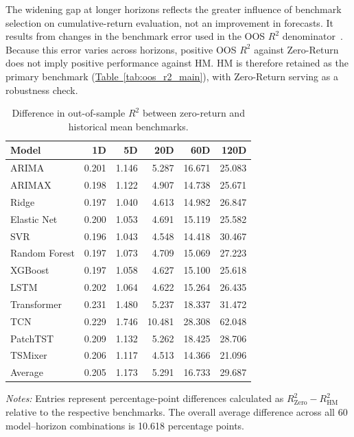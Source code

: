 \documentclass[runningheads,orivec]{llncs}
\begin{document}
The widening gap at longer horizons reflects the greater influence of benchmark selection on cumulative-return evaluation, not an improvement in forecasts. It results from changes in the benchmark error used in the OOS $R^2$ denominator~\cite{campbell2008,welch2008}. Because this error varies across horizons, positive OOS $R^2$ against Zero-Return does not imply positive performance against HM. HM is therefore retained as the primary benchmark (\hyperref[tab:oos_r2_main]{Table~\ref*{tab:oos_r2_main}}), with Zero-Return serving as a robustness check.

\begin{table}[htbp]
\centering
\caption{Difference in out-of-sample $R^2$ between zero-return and historical mean benchmarks.}\label{tab:benchmark_difference}
{\small
\setlength{\tabcolsep}{6pt}
\begin{tabular}{lrrrrr}
\hline
Model & 1D & 5D & 20D & 60D & 120D \\
\hline
ARIMA          & 0.201 & 1.146 &  5.287 & 16.671 & 25.083 \\
ARIMAX         & 0.198 & 1.122 &  4.907 & 14.738 & 25.671 \\
Ridge          & 0.197 & 1.040 &  4.613 & 14.982 & 26.847 \\
Elastic Net    & 0.200 & 1.053 &  4.691 & 15.119 & 25.582 \\
SVR            & 0.196 & 1.043 &  4.548 & 14.418 & 30.467 \\
Random Forest  & 0.197 & 1.073 &  4.709 & 15.069 & 27.223 \\
XGBoost        & 0.197 & 1.058 &  4.627 & 15.100 & 25.618 \\
LSTM           & 0.202 & 1.064 &  4.622 & 15.264 & 26.435 \\
Transformer    & 0.231 & 1.480 &  5.237 & 18.337 & 31.472 \\
TCN            & 0.229 & 1.746 & 10.481 & 28.308 & 62.048 \\
PatchTST       & 0.209 & 1.132 &  5.262 & 18.425 & 28.706 \\
TSMixer        & 0.206 & 1.117 &  4.513 & 14.366 & 21.096 \\
\hline
Average        & 0.205 & 1.173 &  5.291 & 16.733 & 29.687 \\
\hline
\end{tabular}}
\par\vspace{4pt}\parbox{\linewidth}{\linespread{1.2}\selectfont\footnotesize\textit{Notes:} Entries represent percentage-point differences calculated as $R^2_{\mathrm{Zero}} - R^2_{\mathrm{HM}}$ relative to the respective benchmarks. The overall average difference across all 60 model--horizon combinations is 10.618 percentage points.\par}
\end{table}
\end{document}
